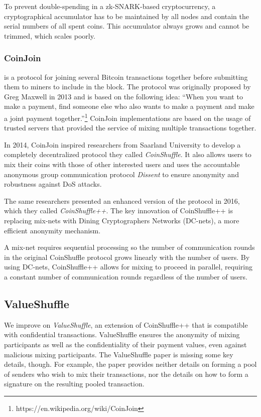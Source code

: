 \documentclass[a4paper, 10pt, conference]{ieeeconf}
\begin{document}
To prevent double-spending in a zk-SNARK-based cryptocurrency, a cryptographical accumulator has to be maintained by all nodes and contain the serial numbers of all spent coins. This accumulator always grows and cannot be trimmed, which scales poorly.

\subsubsection{CoinJoin} is a protocol for joining several Bitcoin transactions together before submitting them to miners to include in the block. The protocol was originally proposed by Greg Maxwell in 2013 and is based on the following idea: ``When you want to make a payment, find someone else who also wants to make a payment and make a joint payment together.''\footnote{https://en.wikipedia.org/wiki/CoinJoin} CoinJoin implementations are based on the usage of trusted servers that provided the service of mixing multiple transactions together.

In 2014, CoinJoin inspired researchers from Saarland University to develop a completely decentralized protocol they called \textit{CoinShuffle}\cite{c17}. It also allows users to mix their coins with those of other interested users and uses the accountable anonymous group communication protocol \textit{Dissent} to ensure anonymity and robustness against DoS attacks. 

The same researchers presented an enhanced version of the protocol in 2016, which they called \textit{CoinShuffle++}\cite{c18}. The key innovation of CoinShuffle++ is replacing mix-nets with Dining Cryptographers Networks (DC-nets)\cite{c20}, a more efficient anonymity mechanism. 

A mix-net requires sequential processing so the number of communication rounds in the original CoinShuffle protocol grows linearly with the number of users. By using DC-nets, CoinShuffle++ allows for mixing to proceed in parallel, requiring a constant number of communication rounds regardless of the number of users. 

\subsection{ValueShuffle}
We improve on \textit{ValueShuffle}\cite{c19}, an extension of CoinShuffle++ that is compatible with confidential transactions. ValueShuffle ensures the anonymity of mixing participants as well as the confidentiality of their payment values, even against malicious mixing participants. The ValueShuffle paper is missing some key details, though. For example, the paper provides neither details on forming a pool of senders who wish to mix their transactions, nor the details on how to form a signature on the resulting pooled transaction. 
\end{document}
